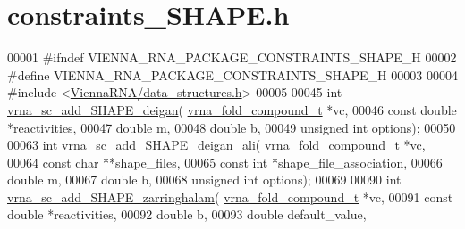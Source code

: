 \hypertarget{constraints__SHAPE_8h_source}{}\section{constraints\+\_\+\+S\+H\+A\+P\+E.\+h}
\label{constraints__SHAPE_8h_source}

\begin{DoxyCode}
00001 \textcolor{preprocessor}{#ifndef VIENNA\_RNA\_PACKAGE\_CONSTRAINTS\_SHAPE\_H}
00002 \textcolor{preprocessor}{#define VIENNA\_RNA\_PACKAGE\_CONSTRAINTS\_SHAPE\_H}
00003 
00004 \textcolor{preprocessor}{#include <\hyperlink{data__structures_8h}{ViennaRNA/data\_structures.h}>}
00005 
00045 \textcolor{keywordtype}{int} \hyperlink{group__SHAPE__reactivities_ga57d612b58e1c61dd6cfcb5a843f8f1b3}{vrna\_sc\_add\_SHAPE\_deigan}( \hyperlink{group__fold__compound_structvrna__fc__s}{vrna\_fold\_compound\_t} *vc,
00046                               \textcolor{keyword}{const} \textcolor{keywordtype}{double} *reactivities,
00047                               \textcolor{keywordtype}{double} m,
00048                               \textcolor{keywordtype}{double} b,
00049                               \textcolor{keywordtype}{unsigned} \textcolor{keywordtype}{int} options);
00050 
00063 \textcolor{keywordtype}{int} \hyperlink{group__SHAPE__reactivities_ga04ba85da63d8c793bb8001d1e6f800ba}{vrna\_sc\_add\_SHAPE\_deigan\_ali}( 
      \hyperlink{group__fold__compound_structvrna__fc__s}{vrna\_fold\_compound\_t} *vc,
00064                                   \textcolor{keyword}{const} \textcolor{keywordtype}{char} **shape\_files,
00065                                   \textcolor{keyword}{const} \textcolor{keywordtype}{int} *shape\_file\_association,
00066                                   \textcolor{keywordtype}{double} m,
00067                                   \textcolor{keywordtype}{double} b,
00068                                   \textcolor{keywordtype}{unsigned} \textcolor{keywordtype}{int} options);
00069 
00090 \textcolor{keywordtype}{int} \hyperlink{group__SHAPE__reactivities_gaf3c65a045060aef5c4e41693d30af58c}{vrna\_sc\_add\_SHAPE\_zarringhalam}( 
      \hyperlink{group__fold__compound_structvrna__fc__s}{vrna\_fold\_compound\_t} *vc,
00091                                     \textcolor{keyword}{const} \textcolor{keywordtype}{double} *reactivities,
00092                                     \textcolor{keywordtype}{double} b,
00093                                     \textcolor{keywordtype}{double} default\_value,

\end{DoxyCode}
